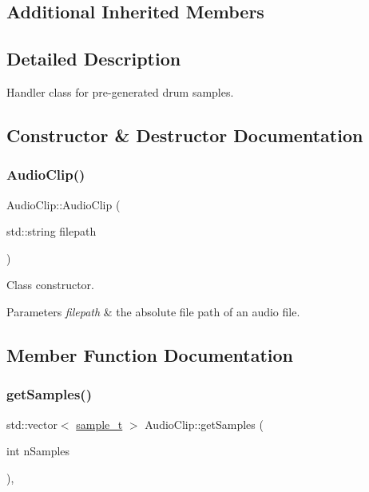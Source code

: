 \subsection*{Additional Inherited Members}


\subsection{Detailed Description}
Handler class for pre-\/generated drum samples. 

\subsection{Constructor \& Destructor Documentation}
\mbox{\label{classdrumpi_1_1audio_1_1AudioClip_aec77804b78d89a21cb789b80a013c4fc}} 
\subsubsection{\texorpdfstring{Audio\+Clip()}{AudioClip()}}
{\footnotesize\ttfamily Audio\+Clip\+::\+Audio\+Clip (\begin{DoxyParamCaption}\item[{std\+::string}]{filepath }\end{DoxyParamCaption})}

Class constructor. 
\begin{DoxyParams}{Parameters}
{\em filepath} & the absolute file path of an audio file. \\
\hline
\end{DoxyParams}


\subsection{Member Function Documentation}
\mbox{\label{classdrumpi_1_1audio_1_1AudioClip_aad8e2b4282047c0fb884d4f93210c83b}} 
\subsubsection{\texorpdfstring{get\+Samples()}{getSamples()}}
{\footnotesize\ttfamily std\+::vector$<$ \hyperlink{namespacedrumpi_1_1audio_aca0bdc9164f87b72057e284442abab6e}{sample\+\_\+t} $>$ Audio\+Clip\+::get\+Samples (\begin{DoxyParamCaption}\item[{int}]{n\+Samples }\end{DoxyParamCaption})\hspace{0.3cm}{\ttfamily [override]}, {\ttfamily [virtual]}}

